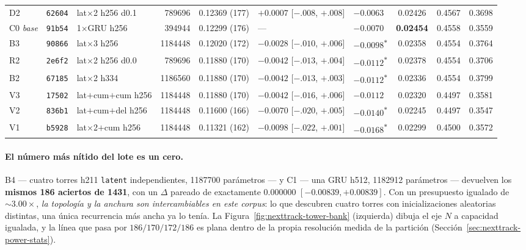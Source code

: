 \documentclass[11pt]{article}
\newcommand{\best}[1]{\textbf{#1}}
\begin{document}
\begin{table}[ht]
{\begin{tabular}{lllrlllccc}
    D2 & \texttt{62604} & lat$\times$2 h256 d\num{0.1} & \num{789696} & 0.12369 (177) & $+0.0007$ [$-.008$, $+.008$] & $-0.0063$ & 0.02426 & 0.4567 & 0.3698 \\
    C0 \emph{base} & \texttt{91b54} & 1$\times$GRU h256 & \num{394944} & 0.12299 (176) & --- & $-0.0070$ & \best{0.02454} & 0.4558 & 0.3559 \\
    B3 & \texttt{90866} & lat$\times$3 h256 & \num{1184448} & 0.12020 (172) & $-0.0028$ [$-.010$, $+.006$] & $\mathbf{-0.0098}$\textsuperscript{$\ast$} & 0.02358 & 0.4554 & 0.3764 \\
    R2 & \texttt{2e6f2} & lat$\times$2 h256 d\num{0.0} & \num{789696} & 0.11880 (170) & $-0.0042$ [$-.013$, $+.004$] & $\mathbf{-0.0112}$\textsuperscript{$\ast$} & 0.02378 & 0.4554 & 0.3706 \\
    B2 & \texttt{67185} & lat$\times$2 h334 & \num{1186560} & 0.11880 (170) & $-0.0042$ [$-.013$, $+.003$] & $\mathbf{-0.0112}$\textsuperscript{$\ast$} & 0.02336 & 0.4554 & 0.3799 \\
    V3 & \texttt{17502} & lat$+$cum$+$cum h256 & \num{1184448} & 0.11880 (170) & $-0.0042$ [$-.016$, $+.006$] & $-0.0112$ & 0.02320 & 0.4497 & 0.3581 \\
    V2 & \texttt{836b1} & lat$+$cum$+$del h256 & \num{1184448} & 0.11600 (166) & $-0.0070$ [$-.020$, $+.005$] & $\mathbf{-0.0140}$\textsuperscript{$\ast$} & 0.02245 & 0.4497 & 0.3547 \\
    V1 & \texttt{b5928} & lat$\times$2$+$cum h256 & \num{1184448} & 0.11321 (162) & $-0.0098$ [$-.022$, $+.001$] & $\mathbf{-0.0168}$\textsuperscript{$\ast$} & 0.02299 & 0.4500 & 0.3572 \\
    \bottomrule
  \end{tabular}}
\end{table}

\paragraph{El número más nítido del lote es un cero.} B4 --- cuatro torres h211
\texttt{latent} independientes, \num{1187700} parámetros --- y C1 --- una GRU h512,
\num{1182912} parámetros --- devuelven los \textbf{mismos \num{186} aciertos de
\num{1431}}, con un $\Delta$ pareado de exactamente $\num{0.000000}$
$[-\num{0.00839},+\num{0.00839}]$. Con un presupuesto igualado de
${\sim}\num{3.00}\times$, \emph{la topología y la anchura son intercambiables en
este corpus}: lo que descubren cuatro torres con inicializaciones aleatorias
distintas, una única recurrencia más ancha ya lo tenía. La
Figura~\ref{fig:nexttrack-tower-bank} (izquierda) dibuja el eje $N$ a capacidad
igualada, y la línea que pasa por $\num{186}/\num{170}/\num{172}/\num{186}$ es
plana dentro de la propia resolución medida de la partición
(Sección~\ref{sec:nexttrack-power-stats}).
\end{document}
